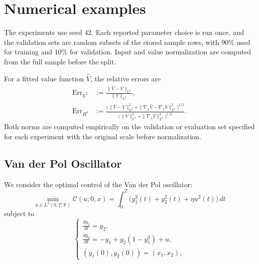 \documentclass[11pt]{amsart}
\theoremstyle{definition}
\theoremstyle{remark}
\begin{document}
\section{Numerical examples}
\label{sec:numerical_examples}
The experiments use seed $42$. Each reported parameter choice is run once, and the validation
sets are random subsets of the stored sample rows, with $90\%$ used for
training and $10\%$ for validation. Input and value normalization are computed
from the full sample before the split.

For a fitted value function $\widehat V$, the relative errors are
\begin{align*}
	\mathrm{Err}_{L^2}
	&:=\frac{\|\widehat V-V\|_{L^2}}{\|V\|_{L^2}},\\
	\mathrm{Err}_{H^1}
	&:=\frac{\big(\|\widehat V-V\|_{L^2}^2
	+\|\nabla_x\widehat V-\nabla_x V\|_{L^2}^2\big)^{1/2}}
	{\big(\|V\|_{L^2}^2+\|\nabla_x V\|_{L^2}^2\big)^{1/2}}.
\end{align*}
Both norms are computed empirically on the validation or evaluation set
specified for each experiment with the original scale before normalization.

\subsection{Van der Pol Oscillator}
\label{sec:vdp}
We consider the optimal control of the Van der Pol oscillator:
\begin{equation*}
\min_{u \in L^2(0,T;\mathbb R)}
\mathcal C(u;0,x)
=\int_0^T\bigl(y_1^2(t)+y_2^2(t)+\eta u^2(t)\bigr)\,dt
\end{equation*}
subject to
\begin{equation*}
\begin{cases}
\frac{dy_1}{dt} = y_2, \\
\frac{dy_2}{dt} = -y_1 + y_2(1 - y_1^2) + u, \\
(y_1(0), y_2(0)) = (x_1, x_2),
\end{cases}
\end{equation*}
\end{document}
